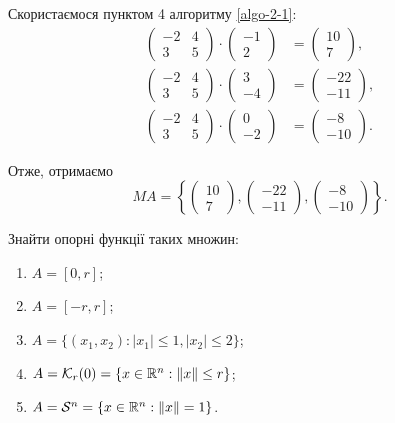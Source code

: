 \begin{solution}
	Скористаємося пунктом 4 алгоритму \ref{algo-2-1}:
	\begin{align*} 
		\begin{pmatrix} -2 & 4 \\ 3 & 5 \end{pmatrix} \cdot \begin{pmatrix} -1 \\ 2 \end{pmatrix} &= \begin{pmatrix} 10 \\ 7 \end{pmatrix}, \\
		\begin{pmatrix} -2 & 4 \\ 3 & 5 \end{pmatrix} \cdot \begin{pmatrix} 3 \\ -4 \end{pmatrix} &= \begin{pmatrix} -22 \\ -11 \end{pmatrix}, \\
		\begin{pmatrix} -2 & 4 \\ 3 & 5 \end{pmatrix} \cdot \begin{pmatrix} 0 \\ -2 \end{pmatrix} &= \begin{pmatrix} -8 \\ -10 \end{pmatrix}.
	\end{align*}
  
  Отже, отримаємо \[MA = \left\{ \begin{pmatrix} 10 \\ 7 \end{pmatrix}, \begin{pmatrix} -22 \\ -11 \end{pmatrix}, \begin{pmatrix} -8 \\ -10 \end{pmatrix} \right\}.\]
\end{solution}

\begin{problem}
	Знайти опорні функції таких множин:

	\begin{enumerate}
		\item $A = [0, r]$;

		\item $A = [-r, r]$;

		\item $A = \{ (x_1, x_2): |x_1| \le 1, |x_2| \le 2 \}$;

		\item $A = \mathcal{K}_r (0) = \{ x \in \mathbb{R}^n: \|x\| \le r \}$;

		\item $A = \mathcal{S}^n = \{ x \in \mathbb{R}^n: \|x\| = 1 \}$.
	\end{enumerate}
\end{problem}

